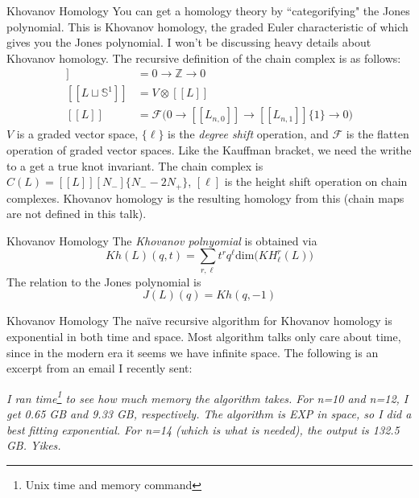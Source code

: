 \documentclass{beamer}
\begin{document}
    \begin{frame}{Khovanov Homology}
        You can get a homology theory by ``categorifying" the Jones polynomial.
        This is Khovanov homology, the graded Euler characteristic of which
        gives you the Jones polynomial. I won't be
        discussing heavy details about Khovanov homology.
        The recursive definition of the chain complex is as follows:
        \begin{align}
            [[\emptyset]]&=0\rightarrow\mathbb{Z}\rightarrow{0}\\
            [[L\sqcup\mathbb{S}^{1}]]&=V\otimes[[L]]\\
            [[L]]&=\mathcal{F}\big(
                0\rightarrow[[L_{n,0}]]\rightarrow[[L_{n,1}]]\{1\}\rightarrow{0}
            \big)
        \end{align}
        $V$ is a graded vector space, $\{\ell\}$ is the
        \textit{degree shift} operation, and $\mathcal{F}$ is the flatten
        operation of graded vector spaces. Like the Kauffman bracket, we need
        the writhe to a get a true knot invariant. The chain complex is
        $C(L)=[[L]][N_{-}]\{N_{-}-2N_{+}\}$, $[\ell]$ is the height shift
        operation on chain complexes. Khovanov homology is the resulting
        homology from this (chain maps are not defined in this talk).
    \end{frame}
    \begin{frame}{Khovanov Homology}
        The \textit{Khovanov polnyomial} is obtained via
	    \begin{equation}
	        Kh(L)(q,t)=
	        \sum_{r,\ell}t^{r}q^{\ell}\textrm{dim}\big(KH_{\ell}^{r}(L)\big)
	    \end{equation}
	    The relation to the Jones polynomial is
	    \begin{equation}
	        J(L)(q)=Kh(q,-1)
	    \end{equation}
    \end{frame}
    \begin{frame}{Khovanov Homology}
        The na\"{i}ve recursive algorithm for Khovanov homology is exponential
        in both time and space. Most algorithm talks only care about time,
        since in the modern era it seems we have infinite space. The following
        is an excerpt from an email I recently sent:
        \begin{flushright}
            \textit{
                I ran time\footnote{Unix time and memory command}
                to see how much memory the algorithm takes.
                For n=10 and n=12, I get 0.65 GB and 9.33 GB, respectively.
                The algorithm is EXP in space, so I did a best fitting
                exponential. For n=14 (which is what is needed), the output is
                132.5 GB. Yikes.
            }
        \end{flushright}
    \end{frame}
\end{document}
